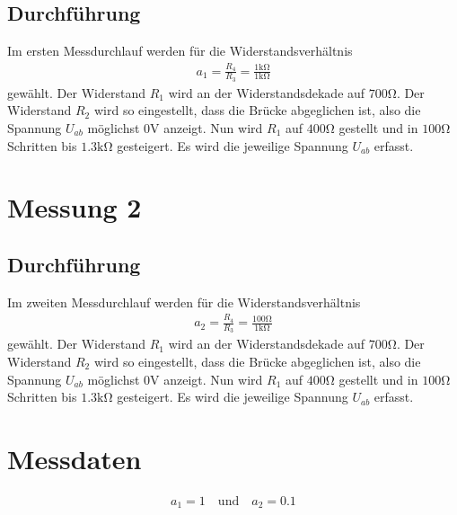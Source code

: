 \subsection{Durchführung}

Im ersten Messdurchlauf werden für die Widerstandsverhältnis
\begin{align}
    a_1 = \frac{R_4}{R_3} = \frac{1 \si{\kilo\ohm}}{1 \si{\kilo\ohm}}
\end{align}
gewählt.
Der Widerstand \( R_1 \) wird an der Widerstandsdekade auf \( 700 \si{\ohm} \).
Der Widerstand \( R_2 \) wird so eingestellt, dass die Brücke abgeglichen ist,
also die Spannung \( U_{ab} \) möglichst \( 0 \si{\volt} \) anzeigt.
Nun wird \( R_1 \) auf \( 400 \si{\ohm} \) gestellt und in \( 100 \si{\ohm} \) Schritten bis \( 1.3 \si{\kilo\ohm} \) gesteigert.
Es wird die jeweilige Spannung \( U_{ab} \) erfasst.

\section[Messung 2]{Messung 2}
\subsection{Durchführung}

Im zweiten Messdurchlauf werden für die Widerstandsverhältnis
\begin{align}
    a_2 = \frac{R_4}{R_3} = \frac{100 \si{\ohm}}{1 \si{\kilo\ohm}}
\end{align}
gewählt.
Der Widerstand \( R_1 \) wird an der Widerstandsdekade auf \( 700 \si{\ohm} \).
Der Widerstand \( R_2 \) wird so eingestellt, dass die Brücke abgeglichen ist,
also die Spannung \( U_{ab} \) möglichst \( 0 \si{\volt} \) anzeigt.
Nun wird \( R_1 \) auf \( 400 \si{\ohm} \) gestellt und in \( 100 \si{\ohm} \) Schritten bis \( 1.3 \si{\kilo\ohm} \) gesteigert.
Es wird die jeweilige Spannung \( U_{ab} \) erfasst.

\section[Messdaten]{Messdaten}

\begin{align*}
    a_1 = 1 \quad \text{und} \quad a_2 = 0.1
\end{align*}

